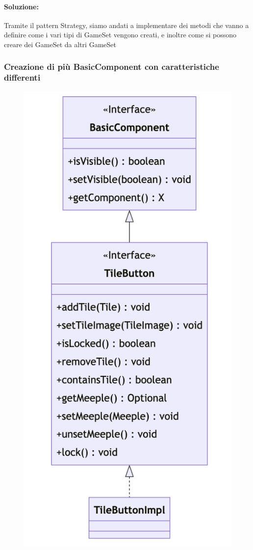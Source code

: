 \paragraph{Soluzione:}
Tramite il pattern Strategy, siamo andati a implementare dei metodi che vanno a definire come i vari tipi di GameSet vengono creati, e inoltre come si possono creare dei GameSet da altri GameSet

\subsubsection*{Creazione di più BasicComponent con caratteristiche differenti}
\begin{figure}[ht]
    \centering\includegraphics[scale=.5]{images/basiccomponent.png}

\end{figure}
